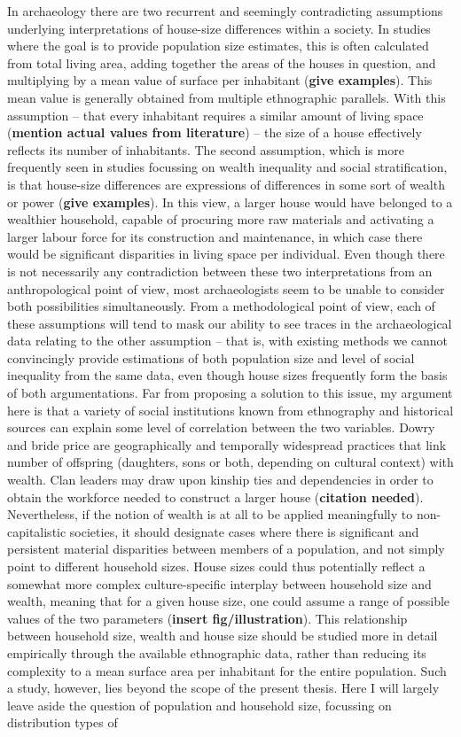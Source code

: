 \documentclass[
  12pt,
]{book}
\begin{document}
In archaeology there are two recurrent and seemingly contradicting assumptions underlying interpretations of house-size differences within a society. In studies where the goal is to provide population size estimates, this is often calculated from total living area, adding together the areas of the houses in question, and multiplying by a mean value of surface per inhabitant (\textbf{give examples}). This mean value is generally obtained from multiple ethnographic parallels. With this assumption -- that every inhabitant requires a similar amount of living space (\textbf{mention actual values from literature}) -- the size of a house effectively reflects its number of inhabitants. The second assumption, which is more frequently seen in studies focussing on wealth inequality and social stratification, is that house-size differences are expressions of differences in some sort of wealth or power (\textbf{give examples}). In this view, a larger house would have belonged to a wealthier household, capable of procuring more raw materials and activating a larger labour force for its construction and maintenance, in which case there would be significant disparities in living space per individual. Even though there is not necessarily any contradiction between these two interpretations from an anthropological point of view, most archaeologists seem to be unable to consider both possibilities simultaneously. From a methodological point of view, each of these assumptions will tend to mask our ability to see traces in the archaeological data relating to the other assumption -- that is, with existing methods we cannot convincingly provide estimations of both population size and level of social inequality from the same data, even though house sizes frequently form the basis of both argumentations. Far from proposing a solution to this issue, my argument here is that a variety of social institutions known from ethnography and historical sources can explain some level of correlation between the two variables. Dowry and bride price are geographically and temporally widespread practices that link number of offspring (daughters, sons or both, depending on cultural context) with wealth. Clan leaders may draw upon kinship ties and dependencies in order to obtain the workforce needed to construct a larger house (\textbf{citation needed}). Nevertheless, if the notion of wealth is at all to be applied meaningfully to non-capitalistic societies, it should designate cases where there is significant and persistent material disparities between members of a population, and not simply point to different household sizes. House sizes could thus potentially reflect a somewhat more complex culture-specific interplay between household size and wealth, meaning that for a given house size, one could assume a range of possible values of the two parameters (\textbf{insert fig/illustration}). This relationship between household size, wealth and house size should be studied more in detail empirically through the available ethnographic data, rather than reducing its complexity to a mean surface area per inhabitant for the entire population. Such a study, however, lies beyond the scope of the present thesis. Here I will largely leave aside the question of population and household size, focussing on distribution types of 
\end{document}
